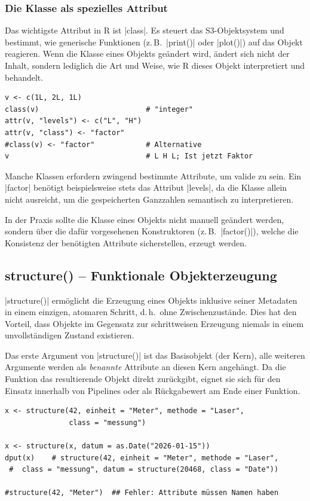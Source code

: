 \documentclass[10pt,twocolumn]{scrartcl}
\renewcommand{\lstinline}{\mycoloredinline}
\begin{document}
\subsubsection{Die Klasse als spezielles Attribut}

Das wichtigste Attribut in R ist \lstinline|class|. Es steuert das S3-Objektsystem und bestimmt, wie generische Funktionen (z.\,B.\ \lstinline|print()| oder \lstinline|plot()|) auf das Objekt reagieren. Wenn die Klasse eines Objekts geändert wird, ändert sich nicht der Inhalt, sondern lediglich die Art und Weise, wie R dieses Objekt interpretiert und behandelt.

\begin{lstlisting}
v <- c(1L, 2L, 1L)
class(v)                         # "integer"
attr(v, "levels") <- c("L", "H")
attr(v, "class") <- "factor"
#class(v) <- "factor"            # Alternative
v                                # L H L; Ist jetzt Faktor
\end{lstlisting}

Manche Klassen erfordern zwingend bestimmte Attribute, um valide zu sein. Ein \lstinline|factor| benötigt beispielsweise stets das Attribut \lstinline|levels|, da die Klasse allein nicht ausreicht, um die gespeicherten Ganzzahlen semantisch zu interpretieren.

In der Praxis sollte die Klasse eines Objekts nicht manuell geändert werden, sondern über die dafür vorgesehenen Konstruktoren (z.\,B.\ \lstinline|factor()|), welche die Konsistenz der benötigten Attribute sicherstellen, erzeugt werden.


\subsection{structure() -- Funktionale Objekterzeugung}

\lstinline|structure()| ermöglicht die Erzeugung eines Objekts inklusive seiner Metadaten in einem einzigen, atomaren Schritt, d.\,h.\ ohne Zwischenzustände. Dies hat den Vorteil, dass Objekte im Gegensatz zur schrittweisen Erzeugung niemals in einem unvollständigen Zustand existieren.

Das erste Argument von \lstinline|structure()| ist das Basisobjekt (der Kern), alle weiteren Argumente werden als \emph{benannte} Attribute an diesen Kern angehängt. Da die Funktion das resultierende Objekt direkt zurückgibt, eignet sie sich für den Einsatz innerhalb von Pipelines oder als Rückgabewert am Ende einer Funktion.

\begin{lstlisting}
x <- structure(42, einheit = "Meter", methode = "Laser",
               class = "messung")

x <- structure(x, datum = as.Date("2026-01-15"))
dput(x)    # structure(42, einheit = "Meter", methode = "Laser",
 #  class = "messung", datum = structure(20468, class = "Date"))

#structure(42, "Meter")  ## Fehler: Attribute müssen Namen haben
\end{lstlisting}
\end{document}
